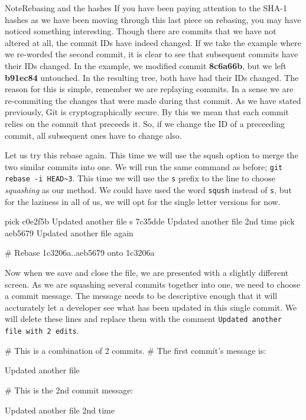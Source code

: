 \begin{callout}{Note}{Rebasing and the hashes}
If you have been paying attention to the SHA-1 hashes as we have been moving through this last piece on rebasing, you may have noticed something interesting.  Though there are commits that we have not altered at all, the commit IDs have indeed changed.  If we take the example where we re-worded the second commit, it is clear to see that subsequent commits have their IDs changed.  In the example, we modified commit \textbf{8c6a66b}, but we left \textbf{b91ec84} untouched.  In the resulting tree, both have had their IDs changed.
\newline
\newline
The reason for this is simple, remember we are replaying commits.  In a sense we are re-commiting the changes that were made during that commit.  As we have stated previously, Git is cryptographically secure.  By this we mean that each commit relies on the commit that preceeds it.  So, if we change the ID of a preceeding commit, all subsequent ones have to change also.
\end{callout}

Let us try this rebase again.  This time we will use the sqush option to merge the two similar commits into one.  We will run the same command as before; \texttt{git rebase -i HEAD\textasciitilde3}.  This time we will use the \texttt{s} prefix to the line to choose \emph{squashing} as our method.  We could have used the word \texttt{sqush} instead of \texttt{s}, but for the laziness in all of us, we will opt for the single letter versions for now.

\begin{code}
pick c0e2f5b Updated another file
s 7c35dde Updated another file 2nd time
pick aeb5679 Updated another file again

# Rebase 1c3206a..aeb5679 onto 1c3206a
\end{code}

Now when we save and close the file, we are presented with a slightly different screen.  As we are squashing several commits together into one, we need to choose a commit message.  The message needs to be descriptive enough that it will accturately let a developer see what has been updated in this single commit.  We will delete these lines and replace them with the comment \texttt{Updated another file with 2 edits}.

\begin{code}
# This is a combination of 2 commits.
# The first commit's message is:

Updated another file

# This is the 2nd commit message:

Updated another file 2nd time
\end{code}

